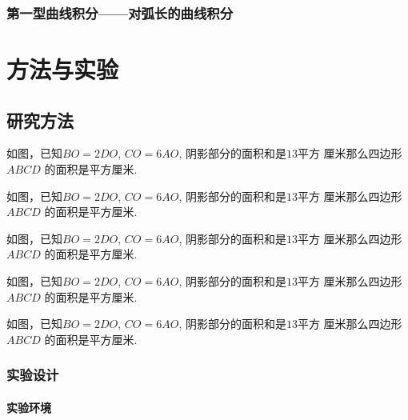\documentclass{USTBBook}
\begin{document}
\cleardoublepage
\section{第一型曲线积分——对弧长的曲线积分}
\zhlipsum[9]

\part{方法与实验}
\ToggleSectionStyle
\ToggleQuestionStyle

\chapter{研究方法} \label{cha:1}

\begin{question}
  如图，已知$BO=2DO$, $CO=6AO$, 阴影部分的面积和是$13$平方
  厘米那么四边形 $ABCD$ 的面积是\fillin[]平方厘米.
\end{question}

\begin{question}
  如图，已知$BO=2DO$, $CO=6AO$, 阴影部分的面积和是$13$平方
  厘米那么四边形 $ABCD$ 的面积是\fillin[]平方厘米.
\end{question}

\begin{question}
  如图，已知$BO=2DO$, $CO=6AO$, 阴影部分的面积和是$13$平方
  厘米那么四边形 $ABCD$ 的面积是\fillin[]平方厘米.
\end{question}

\begin{question}
  如图，已知$BO=2DO$, $CO=6AO$, 阴影部分的面积和是$13$平方
  厘米那么四边形 $ABCD$ 的面积是\fillin[]平方厘米.
\end{question}

\begin{solution}
  如图，已知$BO=2DO$, $CO=6AO$, 阴影部分的面积和是$13$平方
  厘米那么四边形 $ABCD$ 的面积是\fillin[]平方厘米.
\end{solution}

\section{实验设计}
\zhlipsum[11]

\subsection{实验环境}
\zhlipsum[12]
\end{document}
